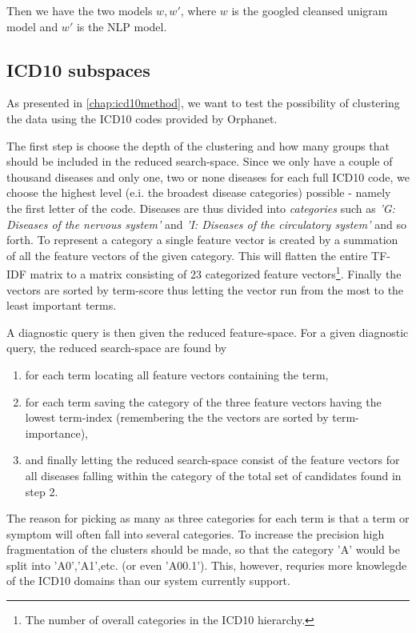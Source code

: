 \documentclass[10pt,letterpaper,final]{article}
\begin{document}
Then we have the two models $w, w'$, where $w$ is the googled cleansed
unigram model and $w'$ is the NLP model.



\subsection{ICD10 subspaces}
As presented in \ref{chap:icd10method}, we want to test the possibility of clustering
the data using the ICD10 codes provided by Orphanet. 

The first step is choose the depth of the clustering and how many groups that should
be included in the reduced search-space. Since we only have a couple of thousand 
diseases and only one, two or none diseases for each full ICD10 code, we choose the
highest level (e.i. the broadest disease categories) possible - namely the first letter
of the code. Diseases are thus divided into \textit{categories} such as \textit{'G: Diseases of the nervous system'}
and \textit{'I: Diseases of the circulatory system'} and so forth. To represent a
category a single feature vector is created by a summation of all the feature vectors of 
the given category. This will flatten the entire TF-IDF matrix to a matrix consisting
of 23 categorized feature vectors\footnote{The number of overall categories in the ICD10 hierarchy.}. 
Finally the vectors are sorted by term-score thus letting the vector run from
the most to the least important terms.

A diagnostic query is then given the reduced feature-space. For a given diagnostic query,
the reduced search-space are found by
\begin{enumerate}
    \item for each term locating all feature vectors containing the term,
    \item for each term saving the category of the three feature vectors having the lowest term-index (remembering the the vectors are sorted by term-importance),
    \item and finally letting the reduced search-space consist of the feature vectors for all diseases falling within the category of the total set of candidates found in step 2.
\end{enumerate}
The reason for picking as many as three categories for each term is that a term or symptom will often fall into several categories. To increase the precision high fragmentation of the clusters should be made, so that the category 'A' would be split into 'A0','A1',etc. (or even 'A00.1'). This, however, requries more knowlegde of the ICD10 domains than our system currently support. 
\end{document}
